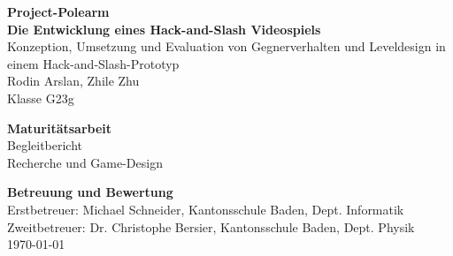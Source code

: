 \documentclass[10pt]{article}
\begin{document}

\begin{titlepage}
    \begin{center}
        \vspace*{2cm}

        \textbf{\Huge{Project-Polearm}} \\ [2em]
        \textbf{\Large Die Entwicklung eines Hack-and-Slash Videospiels} \\ [0.6em]
        \large{Konzeption, Umsetzung und Evaluation von Gegnerverhalten und Leveldesign in einem Hack-and-Slash-Prototyp} \\ [2em]

        \Large{Rodin Arslan, Zhile Zhu} \\ [0.5em]
        \large{Klasse G23g}

        \vspace{3cm}

        \LARGE{\textbf{Maturitätsarbeit}} \\ [0.3em]
        \Large{Begleitbericht} \\
        \large{Recherche und Game-Design}

        \vfill

        \Large{\textbf{Betreuung und Bewertung}} \\ [0.5em]
        \large{Erstbetreuer: Michael Schneider, Kantonsschule Baden, Dept. Informatik} \\
        \large{Zweitbetreuer: Dr. Christophe Bersier, Kantonsschule Baden, Dept. Physik} \\

        \vspace{2cm}
        \large{\today}
    \end{center}
\end{titlepage}

\newpage

\end{document}
